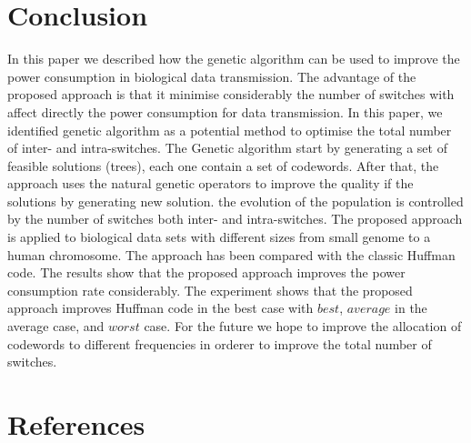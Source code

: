 \documentclass[preprint,12pt]{elsarticle}
\begin{document}
\section{Conclusion}
In this paper we described how the genetic algorithm can be used to improve the power consumption in biological data transmission. The advantage of the proposed approach is that it minimise considerably the number of switches with affect directly the power consumption for data transmission. In this paper, we identified genetic
algorithm as a potential method to optimise the total number of inter- and intra-switches. The Genetic algorithm start by generating a set of feasible solutions (trees), each one contain a set of codewords. After that, the approach uses the natural genetic operators to improve the quality if the solutions by generating new solution. the evolution of the population is controlled by the number of switches both inter- and intra-switches. 
The proposed approach is applied to biological data sets with different sizes from small genome to a human chromosome. The approach has been compared with the classic Huffman code. The results show that
the proposed approach improves the power consumption rate considerably. The experiment shows that the proposed approach improves Huffman code in the best case with $best$,  $average$ in the average case, and $worst$ case. For the future we hope to improve the allocation of codewords to different frequencies in orderer to improve the total number of switches.





\section*{References}


\end{document}
